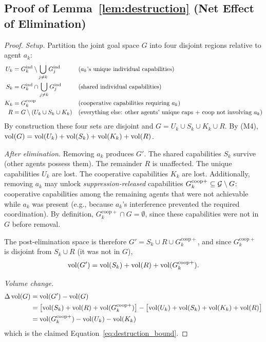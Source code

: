 
\subsection{Proof of Lemma~\ref{lem:destruction} (Net Effect of Elimination)}
\label{app:proof_elimination}

\begin{proof}
\emph{Setup.} Partition the joint goal space $G$ into four disjoint regions
relative to agent $a_k$:
\begin{align*}
U_k &= G_{k}^{\mathrm{ind}} \setminus \bigcup_{j \neq k} G_{j}^{\mathrm{ind}}
  && \text{($a_k$'s unique individual capabilities)} \\
S_k &= G_{k}^{\mathrm{ind}} \cap \bigcup_{j \neq k} G_{j}^{\mathrm{ind}}
  && \text{(shared individual capabilities)} \\
K_k &= G^{\mathrm{coop}}_{k}
  && \text{(cooperative capabilities requiring $a_k$)} \\
R   &= G \setminus (U_k \cup S_k \cup K_k)
  && \text{(everything else: other agents' unique caps + coop not involving $a_k$)}
\end{align*}
By construction these four sets are disjoint and
$G = U_k \cup S_k \cup K_k \cup R$.
By (M4), $\operatorname{vol}(G) = \operatorname{vol}(U_k) + \operatorname{vol}(S_k) + \operatorname{vol}(K_k) + \operatorname{vol}(R)$.

\emph{After elimination.} Removing $a_k$ produces $G'$. The shared
capabilities $S_k$ survive (other agents possess them). The remainder $R$
is unaffected. The unique capabilities $U_k$ are lost. The cooperative
capabilities $K_k$ are lost. Additionally, removing $a_k$ may unlock
\emph{suppression-released} capabilities
$G^{\mathrm{coop}+}_{k} \subseteq \mathcal{G} \setminus G$: cooperative capabilities
among the remaining agents that were not achievable while $a_k$ was present
(e.g., because $a_k$'s interference prevented the required coordination).
By definition, $G^{\mathrm{coop}+}_{k} \cap G = \emptyset$, since these
capabilities were not in $G$ before removal.

The post-elimination space is therefore
$G' = S_k \cup R \cup G^{\mathrm{coop}+}_{k}$, and since
$G^{\mathrm{coop}+}_{k}$ is disjoint from $S_k \cup R$ (it was not in $G$),
\[
\operatorname{vol}(G') = \operatorname{vol}(S_k) + \operatorname{vol}(R) + \operatorname{vol}(G^{\mathrm{coop}+}_{k}).
\]

\emph{Volume change.}
\begin{align*}
\Delta \operatorname{vol}(G) &= \operatorname{vol}(G') - \operatorname{vol}(G) \\
  &= \bigl[\operatorname{vol}(S_k) + \operatorname{vol}(R) + \operatorname{vol}(G^{\mathrm{coop}+}_{k})\bigr]
   - \bigl[\operatorname{vol}(U_k) + \operatorname{vol}(S_k) + \operatorname{vol}(K_k) + \operatorname{vol}(R)\bigr] \\
  &= \operatorname{vol}(G^{\mathrm{coop}+}_{k}) - \operatorname{vol}(U_k) - \operatorname{vol}(K_k)
\end{align*}
which is the claimed Equation~\eqref{eq:destruction_bound}.


\end{proof}
